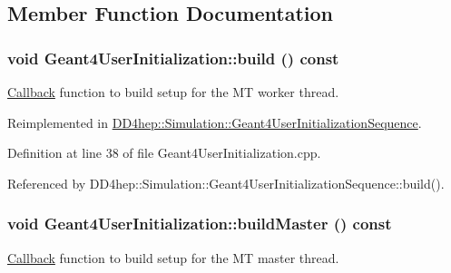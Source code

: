 \subsection{Member Function Documentation}
\hypertarget{class_d_d4hep_1_1_simulation_1_1_geant4_user_initialization_a6313dbf2fcee89a5a9cb60d3cef4ba45}{
\subsubsection[{build}]{\setlength{\rightskip}{0pt plus 5cm}void Geant4UserInitialization::build () const}}
\label{class_d_d4hep_1_1_simulation_1_1_geant4_user_initialization_a6313dbf2fcee89a5a9cb60d3cef4ba45}


\hyperlink{class_d_d4hep_1_1_callback}{Callback} function to build setup for the MT worker thread. 

Reimplemented in \hyperlink{class_d_d4hep_1_1_simulation_1_1_geant4_user_initialization_sequence_a2c9eb901f2697c8f9ba428b49b7252ac}{DD4hep::Simulation::Geant4UserInitializationSequence}.

Definition at line 38 of file Geant4UserInitialization.cpp.

Referenced by DD4hep::Simulation::Geant4UserInitializationSequence::build().\hypertarget{class_d_d4hep_1_1_simulation_1_1_geant4_user_initialization_a382bfc9f7dd55d3c0c91f4bfbfefe1d0}{
\subsubsection[{buildMaster}]{\setlength{\rightskip}{0pt plus 5cm}void Geant4UserInitialization::buildMaster () const}}
\label{class_d_d4hep_1_1_simulation_1_1_geant4_user_initialization_a382bfc9f7dd55d3c0c91f4bfbfefe1d0}


\hyperlink{class_d_d4hep_1_1_callback}{Callback} function to build setup for the MT master thread. 

